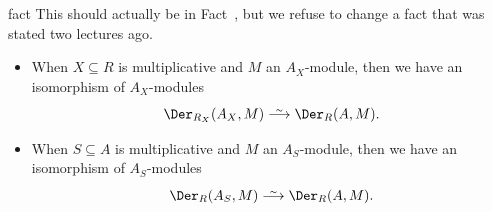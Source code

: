 \documentclass[a4paper,parskip=half,numbers=enddot, DIV=12]{scrreprt}
\begin{document}
\begin{varthm}{fact}
	This should actually be in Fact~, but we refuse to change a fact that was stated two lectures ago.
    \begin{itemize}
      \item[\itememph{c}]
        When $X\subseteq R$ is multiplicative and $M$ an $A_X$-module, then we have an isomorphism of $A_X$-modules
        \begin{align}\lbl{eq:DerLocalizationIso1}
            \Der_{R_X}(A_X,M) \isomorphism \Der_R(A,M).
        \end{align}
      \item[\itememph{d}]
        When $S\subseteq A$ is multiplicative and $M$ an $A_S$-module, then we have an isomorphism of $A_S$-modules
        \begin{align}\lbl{eq:DerLocalizationIso2}
            \Der_R(A_S,M)\isomorphism \Der_R(A,M).
        \end{align}
    \end{itemize}
\end{varthm} 
\end{document}
